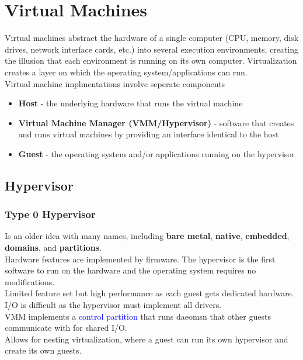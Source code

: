 \documentclass{book/custombook}
\begin{document}
    \chapter{Virtual Machines}
        Virtual machines abstract the hardware of a single computer (CPU, memory, disk drives, network interface cards, etc.)
        into several execution environments, creating the illusion that each environment is running on its own computer.
        Virtualization creates a layer on which the operating system/applications can run.\\
        Virtual machine implmentations involve seperate components
        \begin{itemize}
            \item \textbf{Host} - the underlying hardware that runs the virtual machine
            \item \textbf{Virtual Machine Manager (VMM/Hypervisor)} - software that creates and runs 
            virtual machines by providing an interface identical to the host
            \item \textbf{Guest} - the operating system and/or applications running on the hypervisor
        \end{itemize}
        \section{Hypervisor}
            \subsection{Type 0 Hypervisor}
                Is an older idea with many names, including \textbf{bare metal}, \textbf{native}, \textbf{embedded}, \textbf{domains},
                and \textbf{partitions}.\\
                Hardware features are implemented by firmware. The hypervisor is the first software to run on the hardware and the operating
                system requires no modifications.\\
                Limited feature set but high performance as each guest gets dedicated hardware.\\
                I/O is difficult as the hypervisor must implement all drivers.\\
                VMM implements a \textcolor{blue}{control partition} that runs daeomsn that other guests communicate
                with for shared I/O.\\
                Allows for nesting virtualization, where a guest can run its own hypervisor and create its own guests.
\end{document}
